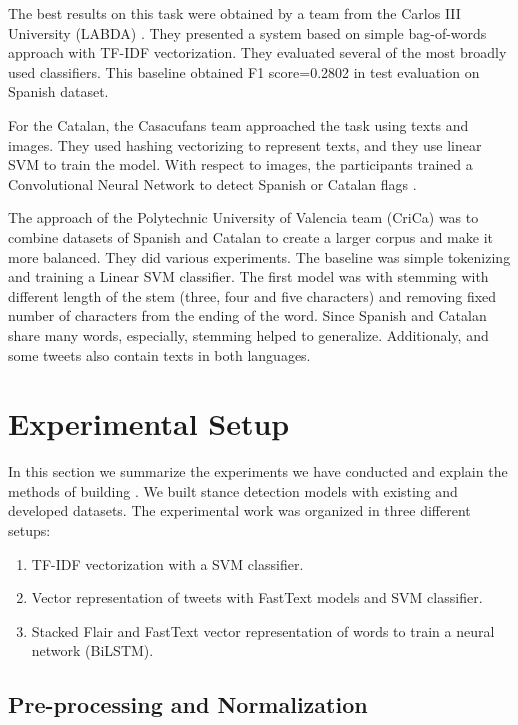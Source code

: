 \documentclass[10pt, a4paper]{article}
\begin{document}
The best results on this task were obtained by a team from the Carlos III University (LABDA) \cite{Segura-Bedmar18}. They presented a system based on simple bag-of-words approach with TF-IDF vectorization. They evaluated several of the most broadly used classifiers. This baseline obtained F1 score=0.2802 in test evaluation on Spanish dataset. 

For the Catalan, the Casacufans team approached the task using texts and images. They used hashing vectorizing to represent texts, and they use linear SVM to train the model. With respect to images, the participants trained a Convolutional Neural Network to detect Spanish or Catalan flags \cite{taule18}.

The approach of the Polytechnic University of Valencia team (CriCa) \cite{Cuquerella2018CriCaTM} was to combine datasets of Spanish and Catalan to create a larger corpus and make it more balanced. They did various experiments. The baseline was simple tokenizing and training a Linear SVM classifier. The first model was with stemming with different length of the stem (three, four and five characters) and removing fixed number of characters from the ending of the word. Since Spanish and Catalan share many words, especially, stemming helped to generalize. Additionaly, and some tweets also contain texts in both languages.

  

\section{Experimental Setup}

In this section we summarize the experiments we have conducted and explain the methods of building . We built stance detection models with existing and developed datasets. The experimental work was organized in three different setups: 

\begin{enumerate} 
\item TF-IDF vectorization with a SVM classifier. 
\item Vector representation of tweets with FastText models and SVM classifier.
\item Stacked Flair and FastText vector representation of words to train a neural network (BiLSTM). 
\end{enumerate}


\subsection{Pre-processing and Normalization}
\end{document}
